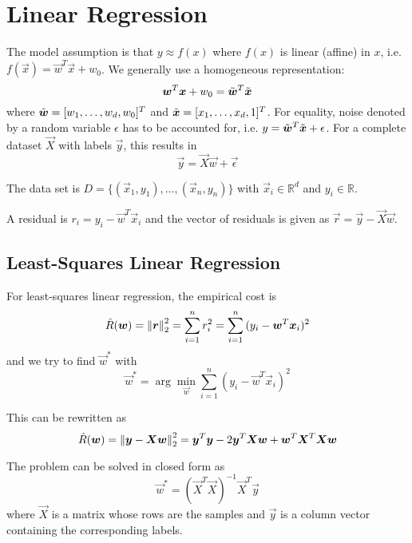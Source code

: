\section{Linear Regression}
The model assumption is that $y \approx f(x)$ where $f(x)$ is
linear (affine) in $x$,
i.e. $f(\vec{x}) = \vec{w}^T \vec{x} + w_0$.
We generally use a homogeneous representation:
\begin{equation*}
    \vec{w}^T \vec{x} + w_0 = \Tilde{\vec{w}}^T \Tilde{\vec{x}}
\end{equation*}
where $\Tilde{\vec{w}} = [w_1, \dotsc, w_d, w_0]^T$ and
$\Tilde{\vec{x}} = [x_1, \dotsc, x_d, 1]^T$.
For equality, noise denoted by a random variable $\epsilon$
has to be accounted for, i.e.
$y = \Tilde{\vec{w}}^T \Tilde{\vec{x}} + \epsilon$.
For a complete dataset $\vec{X}$ with labels $\vec{y}$,
this results in
\begin{equation*}
    \vec{y} = \vec{X} \vec{w} + \vec{\epsilon}
\end{equation*}

The data set is $D = \{(\vec{x}_1, y_1), \dotsc, (\vec{x}_n, y_n)\}$
with $\vec{x}_i \in \mathbb{R}^d$ and $y_i \in \mathbb{R}$.

A residual is $r_i = y_i - \vec{w}^T \vec{x}_i$ and the
vector of residuals is given as
$\vec{r} = \vec{y} - \vec{X}\vec{w}$.

\subsection{Least-Squares Linear Regression}
For least-squares linear regression, the empirical cost is
\begin{equation*}
    \hat{R}(\vec{w}) = \norm{\vec{r}}_2^2
    = \sum_{i = 1}^n{r_i^2}
    = \sum_{i = 1}^n{(y_i - \vec{w}^T \vec{x}_i)^2}
\end{equation*}
and we try to find $\vec{w}^*$ with
\begin{equation*}
    \vec{w}^* = \arg\min_{\vec{w}}{
        \sum_{i = 1}^n{(y_i - \vec{w}^T \vec{x}_i)^2}
    }
\end{equation*}

This can be rewritten as
\begin{equation*}
    \hat{R}(\vec{w})
    = \norm{\vec{y} - \vec{X}\vec{w}}_2^2
    = \vec{y}^T \vec{y} - 2 \vec{y}^T \vec{X} \vec{w} + \vec{w}^T \vec{X}^T \vec{X} \vec{w}
\end{equation*}

The problem can be solved in closed form as
\begin{equation*}
    \vec{w}^* = (\vec{X}^T \vec{X})^{-1} \vec{X}^T \vec{y}
\end{equation*}
where $\vec{X}$ is a matrix whose rows are the samples and
$\vec{y}$ is a column vector containing the corresponding labels.

